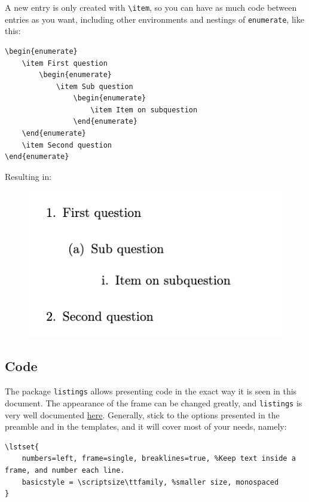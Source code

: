 A new entry is only created with \verb|\item|, so you can have as much code between entries as you want, including other environments and nestings of \verb|enumerate|, like this:
\begin{lstlisting}
\begin{enumerate}
    \item First question
        \begin{enumerate}
            \item Sub question
                \begin{enumerate}
                    \item Item on subquestion
                \end{enumerate}
    \end{enumerate}
    \item Second question
\end{enumerate}
\end{lstlisting}
Resulting in:
\begin{figure}[h]
    \centering
        \includegraphics[]{figures/list-nested.png}
    \label{fig:list-nested}
\end{figure}

\subsection{Code}
The package \verb|listings| allows presenting code in the exact way it is seen in this document.
The appearance of the frame can be changed greatly, and \texttt{listings} is very well documented \href{https://texdoc.org/serve/listings.pdf/0}{here}.
Generally, stick to the options presented in the preamble and in the templates, and it will cover most of your needs, namely:
\begin{lstlisting}
\lstset{
	numbers=left, frame=single, breaklines=true, %Keep text inside a frame, and number each line.
	basicstyle = \scriptsize\ttfamily, %smaller size, monospaced
}
\end{lstlisting}

